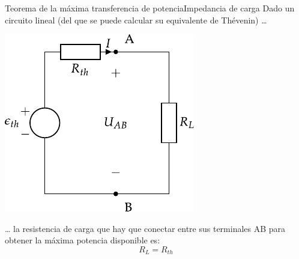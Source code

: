 \documentclass[aspectratio=169, xcolor={usenames,svgnames,dvipsnames}]{beamer}
\begin{document}
\begin{frame}{Teorema de la máxima transferencia de potencia}{Impedancia de carga}
Dado un circuito lineal (del que se puede calcular su equivalente de Thévenin) \ldots{}
\begin{center}
\includegraphics[height=0.45\textheight]{../figs/thevenin_continua.pdf}
\end{center}

\ldots{} la resistencia de carga que hay que conectar entre sus terminales AB para obtener la máxima potencia disponible es:
\[
  \boxed{R_L = R_{th}}
\]
\end{frame}
\end{document}
